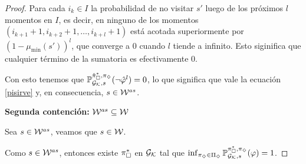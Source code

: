 \begin{proof}
	Para cada $i_k \in I$ la probabilidad de no visitar $s'$ luego de los próximos
	$l$ momentos en $I$, es decir, en ninguno de los momentos $(i_{k+1}+1,
		i_{k+2}+1, \dots, i_{k+l}+1)$ está acotada superiormente por $(1 -
		\mu_\text{min}(s'))^l$, que converge a 0 cuando $l$ tiende a infinito. Esto
	siginifica que cualquier término de la sumatoria es efectivamente 0.

	Con esto tenemos que $\mathbb{P}_{\mathcal{G}_{\mathcal{K}},s}^{\hat{\pi}_{\square}^{*}, \pi_\diamondsuit}(\neg \hat{\varphi}^l)
		= 0$, lo que significa que vale la ecuación \ref{pisirve} y, en consecuencia,
	$s \in \mathcal{W}^{as}$.





	\textbf{Segunda contención: } $\mathcal{W}^{as} \subseteq \mathcal{W}$

	Sea $s \in \mathcal{W}^{as}$, veamos que $s \in \mathcal{W}$.

	Como $s \in \mathcal{W}^{as}$, entonces existe $\pi_\square^*$ en $\mathcal{G}_{\mathcal{K}}$ tal que
	$\inf_{\pi_\diamondsuit \in \Pi_\diamondsuit}\mathbb{P}_{\mathcal{G}_{\mathcal{K}},s}^{\pi_\square^*, \pi_\diamondsuit}(\varphi) = 1$.


\end{proof}
